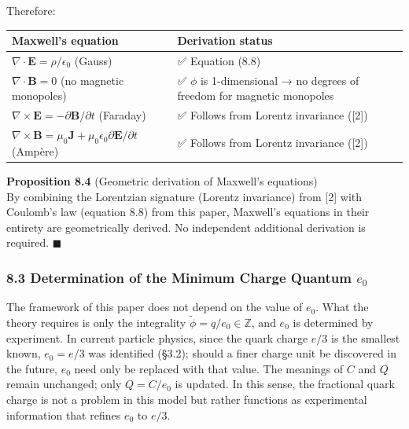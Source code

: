 \documentclass[a4paper,11pt]{article}
\theoremstyle{definition}
\begin{document}
Therefore:

{\def\LTcaptype{none} %
\begin{longtable}[]{@{}
  >{\raggedright\arraybackslash}p{}
  >{\raggedright\arraybackslash}p{}@{}}
\toprule\noalign{}
\begin{minipage}[b]{\linewidth}\raggedright
Maxwell's equation
\end{minipage} & \begin{minipage}[b]{\linewidth}\raggedright
Derivation status
\end{minipage} \\
\midrule\noalign{}
\endhead
\bottomrule\noalign{}
\endlastfoot
\(\nabla \cdot \mathbf{E} = \rho/\epsilon_0\) (Gauss) & ✅ Equation (8.8) \\
\(\nabla \cdot \mathbf{B} = 0\) (no magnetic monopoles) & ✅ \(\phi\) is 1-dimensional → no degrees of freedom for magnetic monopoles \\
\(\nabla \times \mathbf{E} = -\partial\mathbf{B}/\partial t\) (Faraday) & ✅ Follows from Lorentz invariance ({[}2{]}) \\
\(\nabla \times \mathbf{B} = \mu_0\mathbf{J} + \mu_0\epsilon_0\partial\mathbf{E}/\partial t\) (Ampère) & ✅ Follows from Lorentz invariance ({[}2{]}) \\
\end{longtable}
}

\textbf{Proposition 8.4} (Geometric derivation of Maxwell's equations)\\
By combining the Lorentzian signature (Lorentz invariance) from {[}2{]} with Coulomb's law (equation 8.8) from this paper, Maxwell's equations in their entirety are geometrically derived. No independent additional derivation is required. \(\blacksquare\)

\subsubsection{\texorpdfstring{8.3 Determination of the Minimum Charge Quantum \(e_0\)}{8.3 Determination of the Minimum Charge Quantum e\_0}}\label{determination-of-the-minimum-charge-quantum-e_0}

The framework of this paper does not depend on the value of \(e_0\). What the theory requires is only the integrality \(\tilde{\phi} = q/e_0 \in \mathbb{Z}\), and \(e_0\) is determined by experiment. In current particle physics, since the quark charge \(e/3\) is the smallest known, \(e_0 = e/3\) was identified (§3.2); should a finer charge unit be discovered in the future, \(e_0\) need only be replaced with that value. The meanings of \(C\) and \(Q\) remain unchanged; only \(Q = C/e_0\) is updated. In this sense, the fractional quark charge is not a problem in this model but rather functions as experimental information that refines \(e_0\) to \(e/3\).
\end{document}
